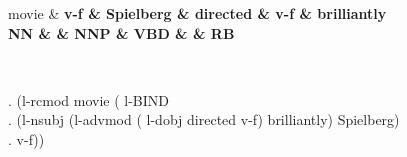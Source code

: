 \documentclass{article}
\begin{document}
\thispagestyle{empty}
\begin{center}
 \begin{dependency}[theme = default]
   \begin{deptext}[column sep=1em]
   movie \& \color{blue} \bf v-f \&  Spielberg \& directed \& \color{red} \bf v-f \& brilliantly \\
   NN \& \& NNP \& VBD \&  \&  RB \\
   \end{deptext}
\end{dependency} \\
\end{center}
{\color{white}.} \hspace{0.2cm} (l-rcmod movie ({\color{blue} l-BIND} \\
{\color{white}.} \hspace{3.2cm} (l-nsubj (l-advmod ({\color{red} l-dobj} directed {\color{red} v-f}) brilliantly) Spielberg) \\
{\color{white}.} \hspace{2.8cm} {\color{blue} v-f}))
\end{document}
